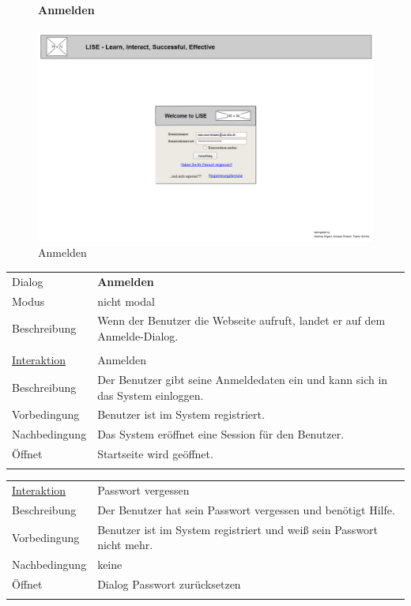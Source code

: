 \documentclass[12pt,a4paper]{article}
\begin{document}
{\begin{figure}[H]
	\paragraph{Anmelden}
	\includegraphics[width=\textwidth]{Bilder/Mockups/GUI/Anmeldung.png}
	\caption{Anmelden}
	\label{GuiAnmelden}
\end{figure}
\begin{tabular}{l p{12cm}}
	Dialog 	 & \textbf{Anmelden} \\ 
	Modus & nicht modal\\ 
	Beschreibung   	& Wenn der Benutzer die Webseite aufruft, landet er auf dem Anmelde-Dialog. \\\\
	
	\underline{Interaktion} 	 & Anmelden\\ 
	Beschreibung   	& Der Benutzer gibt seine Anmeldedaten ein und kann sich in das System einloggen.\\
	Vorbedingung	& Benutzer ist im System registriert.\\
	Nachbedingung	& Das System eröffnet eine Session für den Benutzer. \\
	Öffnet			& Startseite wird geöffnet.\\\\
\end{tabular}

\begin{tabular}{l p{12cm}}
	\underline{Interaktion} 	 & Passwort vergessen\\ 
	Beschreibung   	& Der Benutzer hat sein Passwort vergessen und benötigt Hilfe.\\
	Vorbedingung	& Benutzer ist im System registriert und weiß sein Passwort nicht mehr.\\
	Nachbedingung	& keine \\
	Öffnet			& Dialog \glqq Passwort zurücksetzen\grqq\\\\
\end{tabular}

}
\end{document}
